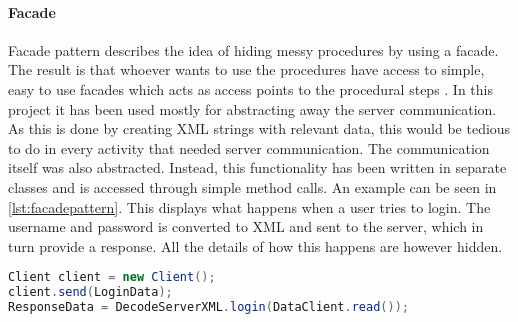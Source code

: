 \paragraph{Facade}
Facade pattern describes the idea of hiding messy procedures by using a facade. The result is that whoever wants to use the procedures have access to simple, easy to use facades which acts as access points to the procedural steps \cite{facpat}. In this project it has been used mostly for abstracting away the server communication. As this is done by creating XML strings with relevant data, this would be tedious to do in every activity that needed server communication. The communication itself was also abstracted. Instead, this functionality has been written in separate classes and is accessed through simple method calls. An example can be seen in \ref{lst:facadepattern}. This displays what happens when a user tries to login. The username and password is converted to XML and sent to the server, which in turn provide a response. All the details of how this happens are however hidden.

\begin{lstlisting}[label={lst:facadepattern}, caption={Abstraction of the login data}, language=java]
Client client = new Client();
client.send(LoginData);
ResponseData = DecodeServerXML.login(DataClient.read());
\end{lstlisting} 

